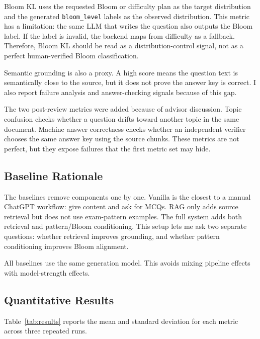 \documentclass[12pt,a4paper]{article}
\begin{document}
Bloom KL uses the requested Bloom or difficulty plan as the target
distribution and the generated \texttt{bloom\_level} labels as the observed
distribution. This metric has a limitation: the same LLM that writes the
question also outputs the Bloom label. If the label is invalid, the backend
maps from difficulty as a fallback. Therefore, Bloom KL should be read as a
distribution-control signal, not as a perfect human-verified Bloom
classification.

Semantic grounding is also a proxy. A high score means the question text is
semantically close to the source, but it does not prove the answer key is
correct. I also report failure analysis and answer-checking signals because
of this gap.

The two post-review metrics were added because of advisor discussion. Topic
confusion checks whether a question drifts toward another topic in the same
document. Machine answer correctness checks whether an independent verifier
chooses the same answer key using the source chunks. These metrics are not
perfect, but they expose failures that the first metric set may hide.

\subsection{Baseline Rationale}

The baselines remove components one by one. Vanilla is the closest to a
manual ChatGPT workflow: give content and ask for MCQs. RAG only adds
source retrieval but does not use exam-pattern examples. The full system
adds both retrieval and pattern/Bloom conditioning. This setup lets me ask
two separate questions: whether retrieval improves grounding, and whether
pattern conditioning improves Bloom alignment.

All baselines use the same generation model. This avoids mixing pipeline
effects with model-strength effects.

\subsection{Quantitative Results}

Table~\ref{tab:results} reports the mean and standard deviation for each
metric across three repeated runs.

\clearpage
\end{document}
